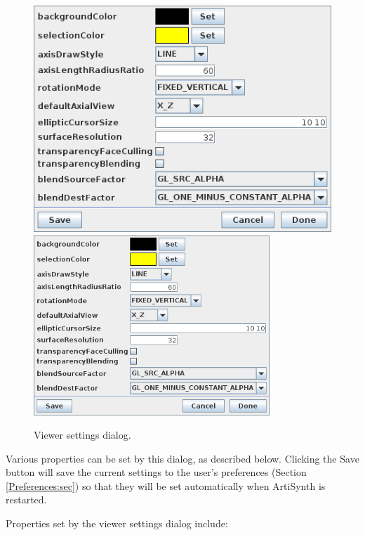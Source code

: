 \documentclass{article}
\begin{document}
\begin{figure}[h]
\begin{center}
\iflatexml
\includegraphics[]{images/viewerSettings}
\else
\includegraphics[width=3.5in]{images/viewerSettings}
\fi
\end{center}
\caption{Viewer settings dialog.}%
\label{viewerSettingsDialog:fig}
\end{figure}

Various properties can be set by this dialog, as described below.
Clicking the {\sf Save} button will save the current settings to the
user's preferences (Section \ref{Preferences:sec}) so that they will
be set automatically when ArtiSynth is restarted.

Properties set by the viewer settings dialog include:
\end{document}
